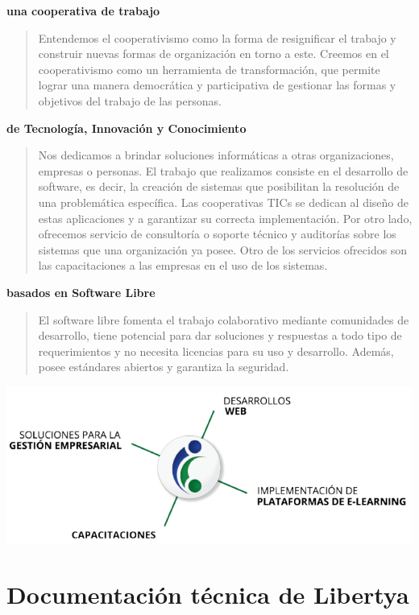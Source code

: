\documentclass[letterpaper,10pt,spanish]{sphinxmanual}
\begin{document}
\textbf{una cooperativa de trabajo}
\begin{quote}

Entendemos el cooperativismo como la forma de resignificar el trabajo y construir nuevas formas de organización en torno a este. Creemos en el cooperativismo como  un herramienta de transformación, que permite lograr una manera democrática y participativa de gestionar las formas y objetivos del trabajo de las personas.
\end{quote}

\textbf{de Tecnología, Innovación y Conocimiento}
\begin{quote}

Nos dedicamos a brindar soluciones informáticas a otras organizaciones, empresas o personas. El trabajo que realizamos consiste en el desarrollo de software, es decir, la creación de sistemas que posibilitan la resolución de una problemática específica. Las cooperativas TICs se dedican al diseño de estas aplicaciones y a garantizar su correcta implementación. Por otro lado, ofrecemos servicio de consultoría o soporte técnico y auditorías sobre los sistemas que una organización ya posee. Otro de los servicios ofrecidos son las capacitaciones a las empresas en el uso de los sistemas.
\end{quote}

\textbf{basados en Software Libre}
\begin{quote}

El software libre fomenta el trabajo colaborativo mediante comunidades de desarrollo, tiene potencial para dar soluciones y respuestas a todo tipo de requerimientos y no necesita licencias para su uso y desarrollo. Además, posee
estándares abiertos y garantiza la seguridad.
\end{quote}

{\hfill\includegraphics{coop_servicios.png}\hfill}


\chapter{Documentación técnica de Libertya}
\label{tecnica::doc}\label{tecnica:documentacion-tecnica-de-libertya}
\end{document}
